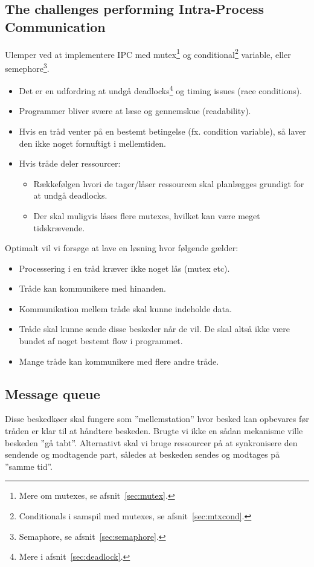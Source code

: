 \subsection{The challenges performing Intra-Process Communication}\label{sec:ipc}
Ulemper ved at implementere IPC med mutex\footnote{Mere om mutexes, se afsnit~\ref{sec:mutex}.} og conditional\footnote{Conditionals i samspil med mutexes, se afsnit~\ref{sec:mtxcond}.} variable, eller semephore\footnote{Semaphore, se afsnit~\ref{sec:semaphore}.}.

\begin{itemize}
	\item Det er en udfordring at undgå deadlocks\footnote{Mere i afsnit~\ref{sec:deadlock}.} og timing issues (race conditions).
	\item Programmer bliver svære at læse og gennemskue (readability).
	\item Hvis en tråd venter på en bestemt betingelse (fx. condition variable), så laver den ikke noget fornuftigt i mellemtiden.
	\item Hvis tråde deler ressourcer:
	\begin{itemize}
		\item Rækkefølgen hvori de tager/låser ressourcen skal planlægges grundigt for at undgå deadlocks.
		\item Der skal muligvis låses flere mutexes, hvilket kan være meget tidskrævende.
	\end{itemize}
\end{itemize}

Optimalt vil vi forsøge at lave en løsning hvor følgende gælder:

\begin{itemize}
	\item Processering i en tråd kræver ikke noget lås (mutex etc). 
	\item Tråde kan kommunikere med hinanden.
	\item Kommunikation mellem tråde skal kunne indeholde data.
	\item Tråde skal kunne sende disse beskeder når de vil. De skal altså ikke være bundet af noget bestemt flow i programmet.
	\item Mange tråde kan kommunikere med flere andre tråde.
\end{itemize}

\subsection{Message queue}
Disse beskedkøer skal fungere som ''mellemstation'' hvor besked kan opbevares før tråden er klar til at håndtere beskeden. Brugte vi ikke en sådan mekanisme ville beskeden ''gå tabt''. Alternativt skal vi bruge ressourcer på at synkronisere den sendende og modtagende part, således at beskeden sendes og modtages på ''samme tid''.

